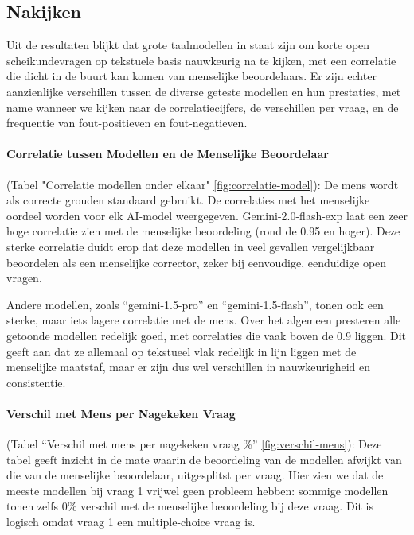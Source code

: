 \documentclass[12pt]{article}
\begin{document}
\subsection{Nakijken}
\begin{multicols}{2}
Uit de resultaten blijkt dat grote taalmodellen in staat zijn om korte open scheikundevragen op tekstuele basis nauwkeurig na te kijken, met een correlatie die dicht in de buurt kan komen van menselijke beoordelaars. Er zijn echter aanzienlijke verschillen tussen de diverse geteste modellen en hun prestaties, met name wanneer we kijken naar de correlatiecijfers, de verschillen per vraag, en de frequentie van fout-positieven en fout-negatieven.

\paragraph*{Correlatie tussen Modellen en de Menselijke Beoordelaar} (Tabel "Correlatie modellen onder elkaar" \ref{fig:correlatie-model}):
De mens wordt als correcte grouden standaard gebruikt. De correlaties met het menselijke oordeel worden voor elk AI-model weergegeven. Gemini-2.0-flash-exp laat een zeer hoge correlatie zien met de menselijke beoordeling (rond de 0.95 en hoger). Deze sterke correlatie duidt erop dat deze modellen in veel gevallen vergelijkbaar beoordelen als een menselijke corrector, zeker bij eenvoudige, eenduidige open vragen.

Andere modellen, zoals “gemini-1.5-pro” en “gemini-1.5-flash”, tonen ook een sterke, maar iets lagere correlatie met de mens. Over het algemeen presteren alle getoonde modellen redelijk goed, met correlaties die vaak boven de 0.9 liggen. Dit geeft aan dat ze allemaal op tekstueel vlak redelijk in lijn liggen met de menselijke maatstaf, maar er zijn dus wel verschillen in nauwkeurigheid en consistentie.

\paragraph*{Verschil met Mens per Nagekeken Vraag} (Tabel “Verschil met mens per nagekeken vraag \%” \ref{fig:verschil-mens}):
Deze tabel geeft inzicht in de mate waarin de beoordeling van de modellen afwijkt van die van de menselijke beoordelaar, uitgesplitst per vraag. Hier zien we dat de meeste modellen bij vraag 1 vrijwel geen probleem hebben: sommige modellen tonen zelfs 0\% verschil met de menselijke beoordeling bij deze vraag. Dit is logisch omdat vraag 1 een multiple-choice vraag is.


\end{multicols}
\end{document}
